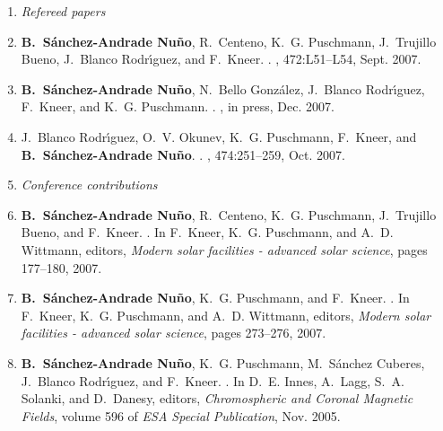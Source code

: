 \documentclass[goettingen,print]{thesis}
\begin{document}
\begin{enumerate}
\item[] \emph{Refereed papers}
\item
\textbf{B.~{S{\'a}nchez-Andrade Nu{\~n}o}}, R.~{Centeno}, K.~G. {Puschmann},
  J.~{Trujillo Bueno}, J.~{Blanco Rodr{\'{\i}}guez}, and F.~{Kneer}.
.
\newblock {\em \aap}, 472:L51--L54, Sept. 2007.
\item
\textbf{B.~{S{\'a}nchez-Andrade Nu{\~n}o}},  N.~Bello Gonz\'alez, J.~{Blanco Rodr{\'{\i}}guez}, F.~{Kneer},   and K.~G. {Puschmann}.
.
\newblock {\em \aap}, in press, Dec. 2007.

\item
J.~{Blanco Rodr{\'{\i}}guez}, O.~V. {Okunev}, K.~G. {Puschmann}, F.~{Kneer},
  and \textbf{B.~{S{\'a}nchez-Andrade Nu{\~n}o}}.
.
\newblock {\em \aap}, 474:251--259, Oct. 2007.

\item[]  \emph{Conference contributions}
\item
\textbf{B.~{S{\'a}nchez-Andrade Nu{\~n}o}}, R.~{Centeno}, K.~G. {Puschmann},
  J.~{Trujillo Bueno}, and F.~{Kneer}.
.
\newblock In F.~{Kneer}, K.~G. {Puschmann}, and A.~D. {Wittmann}, editors, {\em
  Modern solar facilities - advanced solar science},
  pages 177--180, 2007.

\item
\textbf{B.~{S{\'a}nchez-Andrade Nu{\~n}o}}, K.~G. {Puschmann}, and F.~{Kneer}.
.
\newblock In F.~{Kneer}, K.~G. {Puschmann}, and A.~D. {Wittmann}, editors, {\em
  Modern solar facilities - advanced solar science},
  pages 273--276, 2007.

\item
\textbf{B.~{S{\'a}nchez-Andrade Nu{\~n}o}}, K.~G. {Puschmann}, M.~{S{\'a}nchez Cuberes},
  J.~{Blanco Rodr{\'{\i}}guez}, and F.~{Kneer}.
.
\newblock In D.~E. {Innes}, A.~{Lagg}, S.~A. {Solanki}, and D.~Danesy, editors, {\em
  Chromospheric and Coronal Magnetic Fields}, volume 596 of {\em ESA Special
  Publication}, Nov. 2005.


\end{enumerate}
\end{document}
